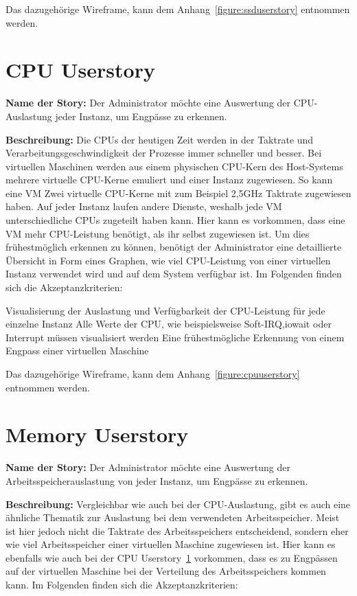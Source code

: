 Das dazugehörige Wireframe, kann dem Anhang~\ref{figure:ssduserstory} entnommen
werden.
\mr%

\section{CPU Userstory}
\label{section:CPU_Userstory}
\textbf{Name der Story:} Der Administrator möchte eine Auswertung der
CPU\hyp{}Auslastung jeder Instanz, um Engpässe zu erkennen.

\textbf{Beschreibung:} Die CPUs der heutigen Zeit werden in der Taktrate und
Verarbeitungsgeschwindigkeit der Prozesse immer schneller und besser. Bei
virtuellen Maschinen werden aus einem physischen CPU\hyp{}Kern des
Host\hyp{}Systems mehrere virtuelle CPU\hyp{}Kerne emuliert und einer Instanz
zugewiesen. So kann eine VM Zwei virtuelle CPU\hyp{}Kerne mit zum Beispiel
2,5\si{\giga\hertz} Taktrate zugewiesen haben. Auf jeder Instanz laufen andere
Dienste, weshalb jede VM unterschiedliche CPUs zugeteilt haben kann. Hier kann
es vorkommen, dass eine VM mehr CPU\hyp{}Leistung benötigt, als ihr selbst
zugewiesen ist. Um dies frühestmöglich erkennen zu können, benötigt der
Administrator eine detaillierte Übersicht in Form eines Graphen, wie viel
CPU\hyp{}Leistung von einer virtuellen Instanz verwendet wird und auf dem
System verfügbar ist. Im Folgenden finden sich die Akzeptanzkriterien:

\begin{outline}
  \1 Visualisierung der Auslastung und Verfügbarkeit der CPU\hyp{}Leistung für
  jede einzelne Instanz
  \1 Alle Werte der CPU, wie beispielsweise \gls{Soft-IRQ},\gls{iowait} oder
  \gls{Interrupt} müssen visualisiert werden
  \1 Eine frühestmögliche Erkennung von einem Engpass einer virtuellen Maschine
\end{outline}

Das dazugehörige Wireframe, kann dem Anhang~\ref{figure:cpuuserstory} entnommen
werden.
\mr%

\section{Memory Userstory}
\textbf{Name der Story:} Der Administrator möchte eine Auswertung der
Arbeitsspeicherauslastung von jeder Instanz, um Engpässe zu erkennen.

\textbf{Beschreibung:} Vergleichbar wie auch bei der CPU\hyp{}Auslastung, gibt
es auch eine ähnliche Thematik zur Auslastung bei dem verwendeten
Arbeitsspeicher. Meist ist hier jedoch nicht die Taktrate des Arbeitsspeichers
entscheidend, sondern eher wie viel Arbeitsspeicher einer virtuellen Maschine
zugewiesen ist. Hier kann es ebenfalls wie auch bei der CPU
Userstory~\ref{section:CPU_Userstory} vorkommen, dass es zu Engpässen auf der
virtuellen Maschine bei der Verteilung des Arbeitsspeichers kommen kann. Im
Folgenden finden sich die Akzeptanzkriterien:

